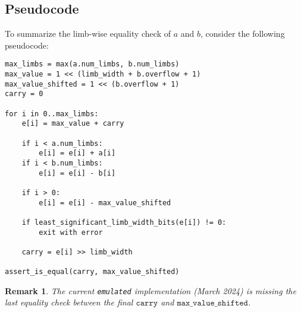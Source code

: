 \documentclass[a4paper, 12pt]{article}
\newtheorem*{remark}{Remark}
\begin{document}
\subsection{Pseudocode}%
\label{sec:pseudocode}
To summarize the limb-wise equality check of $a$ and $b$, consider the following pseudocode:

\begin{verbatim}
max_limbs = max(a.num_limbs, b.num_limbs)
max_value = 1 << (limb_width + b.overflow + 1)
max_value_shifted = 1 << (b.overflow + 1)
carry = 0

for i in 0..max_limbs:
    e[i] = max_value + carry

    if i < a.num_limbs:
        e[i] = e[i] + a[i]
    if i < b.num_limbs:
        e[i] = e[i] - b[i]

    if i > 0:
        e[i] = e[i] - max_value_shifted
    
    if least_significant_limb_width_bits(e[i]) != 0:
        exit with error

    carry = e[i] >> limb_width

assert_is_equal(carry, max_value_shifted)
\end{verbatim}

\begin{remark}
The current \texttt{emulated} implementation (March 2024) is missing the last equality check between the final $\texttt{carry}$ and $\texttt{max\_value\_shifted}$.
\end{remark}
\end{document}
